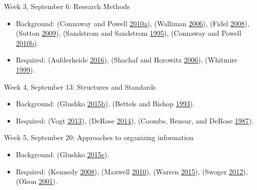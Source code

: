 \documentclass[]{article}
\providecommand{\tightlist}{%
  \setlength{\itemsep}{0pt}\setlength{\parskip}{0pt}}
\begin{document}
Week 3, September 6: Research Methods

\begin{itemize}
\tightlist
\item
  Background: (Connaway and Powell
  \protect\hyperlink{ref-connawayux5fbasicux5f2010}{2010}\protect\hyperlink{ref-connawayux5fbasicux5f2010}{a}),
  (Walliman \protect\hyperlink{ref-wallimanux5fdefiningux5f2006}{2006}),
  (Fidel \protect\hyperlink{ref-fidelux5fareux5f2008}{2008}), (Sutton
  \protect\hyperlink{ref-suttonux5fqualitativeux5f2009}{2009}),
  (Sandstrom and Sandstrom
  \protect\hyperlink{ref-sandstromux5fuseux5f1995}{1995}), (Connaway and
  Powell
  \protect\hyperlink{ref-connawayux5fselectingux5f2010}{2010}\protect\hyperlink{ref-connawayux5fselectingux5f2010}{b}).
\item
  Required: (Aufderheide
  \protect\hyperlink{ref-aufderheideux5fdoesux5f2016}{2016}), (Shachaf
  and Horowitz \protect\hyperlink{ref-shachafux5fareux5f2006}{2006}),
  (Whitmire \protect\hyperlink{ref-whitmireux5fracialux5f1999}{1999}).
\end{itemize}

Week 4, September 13: Structures and Standards

\begin{itemize}
\tightlist
\item
  Background: (Glushko
  \protect\hyperlink{ref-glushkoux5fdescribingux5f2015}{2015}\protect\hyperlink{ref-glushkoux5fdescribingux5f2015}{b}),
  (Bettels and Bishop
  \protect\hyperlink{ref-bettelsux5funicode:ux5f1993}{1993}).
\item
  Required: (Vogt
  \protect\hyperlink{ref-vogtux5fescienceux5f2013}{2013}), (DeRose
  \protect\hyperlink{ref-deroseux5fwhatux5f2014}{2014}), (Coombs,
  Renear, and DeRose
  \protect\hyperlink{ref-coombsux5fmarkupux5f1987}{1987}).
\end{itemize}

Week 5, September 20: Approaches to organizing information

\begin{itemize}
\tightlist
\item
  Background: (Glushko
  \protect\hyperlink{ref-glushkoux5fresourcesux5f2015}{2015}\protect\hyperlink{ref-glushkoux5fresourcesux5f2015}{e}).
\item
  Required: (Kennedy
  \protect\hyperlink{ref-kennedyux5fnineux5f2008}{2008}), (Maxwell
  \protect\hyperlink{ref-maxwellux5fbibliographicux5f2010}{2010}),
  (Warren \protect\hyperlink{ref-warrenux5f2015ux5f2015}{2015}), (Swoger
  \protect\hyperlink{ref-swogerux5fwhatux5f2012}{2012}), (Olson
  \protect\hyperlink{ref-olsonux5fpowerux5f2001}{2001}).
\end{itemize}
\end{document}
